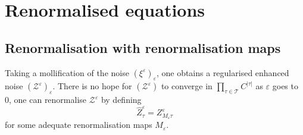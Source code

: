 \documentclass[11pt]{preprint}
\newcommand{\mcI}{\mathcal{I}}
\newcommand{\mcZ}{\mathcal{Z}}
\newcommand{\mcT}{\mathcal{T}}
\def\eps{\varepsilon}
\let\eps\varepsilon
\newcommand{\bfN}{\mathbf{N}}
\begin{document}
		
		
		
		
		
		
		
	
	
	
	
	
	
	
	
	
	
	
	
	
	
	
	
	
	
	
	\section{Renormalised equations} \label{section_renormalized_equation}
	
	
	\subsection{Renormalisation with renormalisation maps}
	
	
	Taking a mollification of the noise $(\xi^\eps)_{\eps}$, one obtains  a regularised enhanced noise $(\mcZ^\eps)_\eps$. There is no hope for $(\mcZ^\eps)$ to converge in $\prod_{\tau\in\mcT} C^{|\tau|}$ as $\eps$ goes to $0$, one can renormalise $\mcZ^\eps$ by defining
	$$
	\widehat Z^\eps_\tau = Z^\eps_{M_\eps\tau}
	$$
	for some adequate renormalisation maps $M_\eps$.
	
\end{document}
